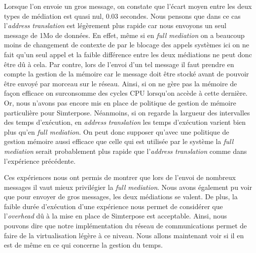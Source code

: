 Lorsque l'on envoie un gros message, on constate que l'écart moyen entre les deux types de médiation est quasi nul, 0.03 secondes. Nous pensons que dans ce cas l'\textit{address translation} est légèrement plus rapide car nous envoyons un seul message de 1Mo de données. En effet, même si en \textit{full mediation} on a beaucoup moins de changement de contexte de par le blocage des appels systèmes ici on ne fait qu'un seul appel et la faible différence entre les deux médiations ne peut donc être dû à cela. Par contre, lors de l'envoi d'un tel message il faut prendre en compte la gestion de la mémoire car le message doit être stocké avant de pouvoir être envoyé par morceau sur le réseau. Ainsi, si on ne gère pas la mémoire de façon efficace on surconsomme des cycles CPU lorsqu'on accède à cette dernière. Or, nous n'avons pas encore mis en place de politique de gestion de mémoire particulière pour Simterpose. Néanmoins, si on regarde la largueur des intervalles des temps d'exécution, en \textit{address translation} les temps d'exécution varient bien plus qu'en \textit{full mediation}. On peut donc supposer qu'avec une politique de gestion mémoire aussi efficace que celle qui est utilisée par le système la \textit{full mediation} serait probablement plus rapide que l'\textit{address translation} comme dans l'expérience précédente.

Ces expériences nous ont permis de montrer que lors de l'envoi de nombreux messages il vaut mieux privilégier la \textit{full mediation}. Nous avons également pu voir que pour envoyer de gros messages, les deux médiations se valent. De plus, la faible durée d'exécution d'une expérience nous permet de considérer que l'\textit{overhead} dû à la mise en place de Simterpose est acceptable. Ainsi, nous pouvons dire que notre implémentation du réseau de communications permet de faire de la virtualisation légère à ce niveau. Nous allons maintenant voir si il en est de même en ce qui concerne la gestion du temps.
